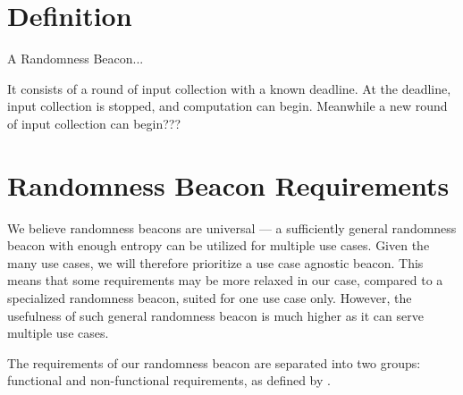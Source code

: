 \section{Definition}

A Randomness Beacon... 

It consists of a round of input collection with a known deadline. At the deadline, input collection is stopped, and computation can begin. Meanwhile a new round of input collection can begin???

\section{Randomness Beacon Requirements}
\label{sec:beacon_requirements}

We believe randomness beacons are universal --- a sufficiently general randomness beacon with enough entropy can be utilized for multiple use cases. Given the many use cases, we will therefore prioritize a use case agnostic beacon.
This means that some requirements may be more relaxed in our case, compared to a specialized randomness beacon, suited for one use case only. However, the usefulness of such general randomness beacon is much higher as it can serve multiple use cases.

The requirements of our randomness beacon are separated into two groups: functional and non-functional requirements, as defined by \citet[sec.\ 1.4.1]{swebok} .

